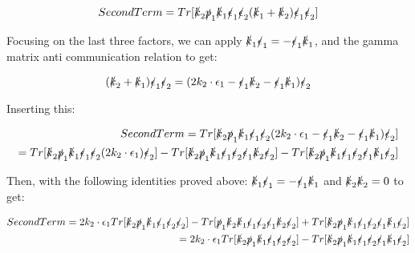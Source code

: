 \documentclass[a4]{article}
\begin{document}
    \begin{equation}
        Second Term = Tr [\slashed{k}_2 \slashed{p}_1 \slashed{k}_1 \slashed{\epsilon}_1 \slashed{\epsilon}_2 (\slashed{k}_1 + \slashed{k}_2) \slashed{\epsilon}_1 \slashed{\epsilon}_2]
    \end{equation}

    Focusing on the last three factors, we can apply $\slashed{k}_1 \slashed{\epsilon}_1 = - \slashed{\epsilon}_1 \slashed{k}_1$, and the gamma matrix anti communication relation to get:

    \begin{equation}
        (\slashed{k}_2 + \slashed{k}_1) \slashed{\epsilon}_1 \slashed{\epsilon}_2 = (2 k_2 \cdot \epsilon_1 - \slashed{\epsilon}_1 \slashed{k}_2 - \slashed{\epsilon}_1 \slashed{k}_1) \slashed{\epsilon}_2
    \end{equation}

    Inserting this:

    \begin{eqnarray}
        Second Term = Tr [\slashed{k}_2 \slashed{p}_1 \slashed{k}_1 \slashed{\epsilon}_1 \slashed{\epsilon}_2 (2 k_2 \cdot \epsilon_1 - \slashed{\epsilon}_1 \slashed{k}_2 - \slashed{\epsilon}_1 \slashed{k}_1) \slashed{\epsilon}_2] \\
        = Tr [\slashed{k}_2 \slashed{p}_1 \slashed{k}_1 \slashed{\epsilon}_1 \slashed{\epsilon}_2 (2 k_2 \cdot \epsilon_1) \slashed{\epsilon}_2] - Tr [\slashed{k}_2 \slashed{p}_1 \slashed{k}_1 \slashed{\epsilon}_1 \slashed{\epsilon}_2 \slashed{\epsilon}_1 \slashed{k}_2 \slashed{\epsilon}_2] - Tr [\slashed{k}_2 \slashed{p}_1 \slashed{k}_1 \slashed{\epsilon}_1 \slashed{\epsilon}_2 \slashed{\epsilon}_1 \slashed{k}_1 \slashed{\epsilon}_2]
    \end{eqnarray}

    Then, with the following identities proved above: $\slashed{k}_1 \slashed{\epsilon}_1 = - \slashed{\epsilon}_1 \slashed{k}_1$ and $\slashed{k}_2 \slashed{k}_2 = 0$ to get:

    \begin{eqnarray}
        Second Term = 2 k_2 \cdot \epsilon_1 Tr [\slashed{k}_2 \slashed{p}_1 \slashed{k}_1 \slashed{\epsilon}_1 \slashed{\epsilon}_2 \slashed{\epsilon}_2] - Tr [\slashed{p}_1 \slashed{k}_2 \slashed{k}_1 \slashed{\epsilon}_1 \slashed{\epsilon}_2 \slashed{\epsilon}_1 \slashed{k}_2 \slashed{\epsilon}_2] + Tr [\slashed{k}_2 \slashed{p}_1 \slashed{k}_1 \slashed{\epsilon}_1 \slashed{\epsilon}_2 \slashed{\epsilon}_1 \slashed{k}_1 \slashed{\epsilon}_2] \\
        = 2 k_2 \cdot \epsilon_1 Tr [\slashed{k}_2 \slashed{p}_1 \slashed{k}_1 \slashed{\epsilon}_1 \slashed{\epsilon}_2 \slashed{\epsilon}_2] - Tr [\slashed{k}_2 \slashed{p}_1 \slashed{k}_1 \slashed{\epsilon}_1 \slashed{\epsilon}_2 \slashed{\epsilon}_1 \slashed{k}_1 \slashed{\epsilon}_2]
    \end{eqnarray}
\end{document}
